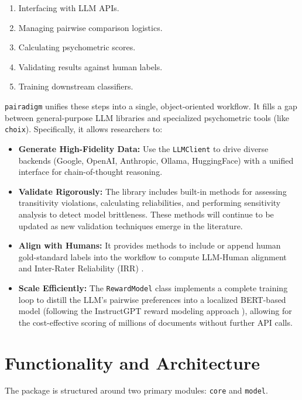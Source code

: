 \documentclass[11pt]{article}
\begin{document}
\begin{enumerate}
    \item Interfacing with LLM APIs.
    \item Managing pairwise comparison logistics.
    \item Calculating psychometric scores.
    \item Validating results against human labels.
    \item Training downstream classifiers.
\end{enumerate}

\texttt{pairadigm} unifies these steps into a single, object-oriented workflow. It fills a gap between general-purpose LLM libraries and specialized psychometric tools (like \texttt{choix}). Specifically, it allows researchers to:

\begin{itemize}
    \item \textbf{Generate High-Fidelity Data:} Use the \texttt{LLMClient} to drive diverse backends (Google, OpenAI, Anthropic, Ollama, HuggingFace) with a unified interface for chain-of-thought reasoning.
    \item \textbf{Validate Rigorously:} The library includes built-in methods for assessing transitivity violations, calculating reliabilities, and performing sensitivity analysis to detect model brittleness. These methods will continue to be updated as new validation techniques emerge in the literature.
    \item \textbf{Align with Humans:} It provides methods to include or append human gold-standard labels into the workflow to compute LLM-Human alignment and Inter-Rater Reliability (IRR) \citep{cohen:1960}.
    \item \textbf{Scale Efficiently:} The \texttt{RewardModel} class implements a complete training loop to distill the LLM's pairwise preferences into a localized BERT-based model (following the InstructGPT reward modeling approach \citep{ouyang:2022}), allowing for the cost-effective scoring of millions of documents without further API calls.
\end{itemize}

\section{Functionality and Architecture}

The package is structured around two primary modules: \texttt{core} and \texttt{model}.
\end{document}
